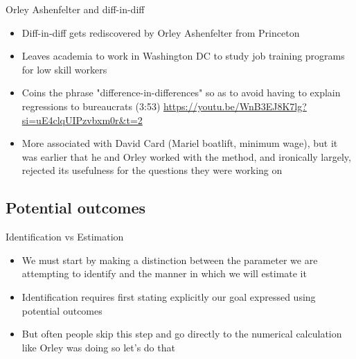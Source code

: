 \documentclass{beamer}
\begin{document}
\begin{frame}{Orley Ashenfelter and diff-in-diff}

\begin{itemize}

\item Diff-in-diff gets rediscovered by Orley Ashenfelter from Princeton 
\item Leaves academia to work in Washington DC to study job training programs for low skill workers
\item Coins the phrase "difference-in-differences" so as to avoid having to explain regressions to bureaucrats (3:53)  \url{https://youtu.be/WnB3EJ8K7lg?si=uE4clqUIPzvbxm0r&t=2}
\item More associated with David Card (Mariel boatlift, minimum wage), but it was earlier that he and Orley worked with the method, and ironically largely, rejected its usefulness for the questions they were working on

\end{itemize}

\end{frame}




\subsection{Potential outcomes}


\begin{frame}{Identification vs Estimation}

\begin{itemize}
\item We must start by making a distinction between the parameter we are attempting to identify and the manner in which we will estimate it
\item Identification requires first stating explicitly our goal expressed using potential outcomes
\item But often people skip this step and go directly to the numerical calculation like Orley was doing so let's do that

\end{itemize}

\end{frame}
\end{document}
